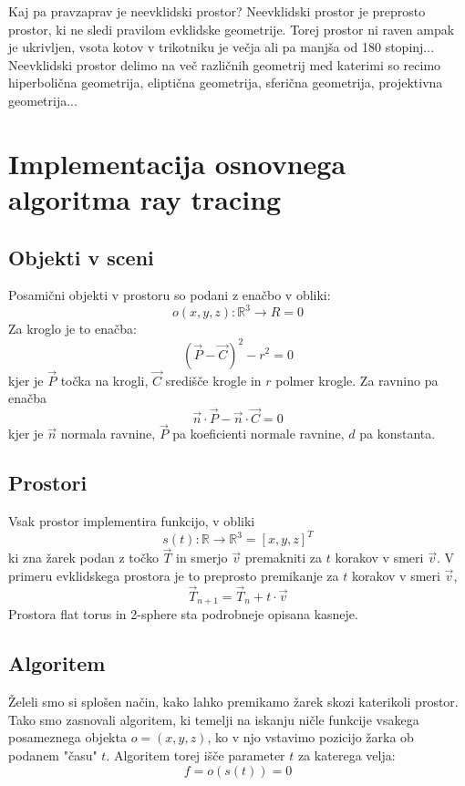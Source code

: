 \documentclass[titlepage]{article}
\begin{document}
Kaj pa pravzaprav je neevklidski prostor?
Neevklidski prostor je preprosto prostor, ki ne sledi pravilom evklidske geometrije. Torej prostor ni raven ampak je ukrivljen, vsota kotov v trikotniku je večja ali pa manjša od 180 stopinj... Neevklidski prostor delimo na več različnih geometrij med katerimi so recimo hiperbolična geometrija, eliptična geometrija, sferična geometrija, projektivna geometrija...

\section{Implementacija osnovnega algoritma ray tracing}
\subsection{Objekti v sceni}
Posamični objekti v prostoru so podani z enačbo v obliki:
\[ o(x,y,z): \mathbb{R}^3 \to R =0 \]
Za kroglo je to enačba: 
\[ (\vec{P} - \vec{C})^2 - r^2 = 0 \]
kjer je \(\vec{P}\) točka na krogli, \(\vec{C}\) središče krogle in \(r\) polmer krogle. \newline
Za ravnino pa enačba 
\[ \vec{n} \cdot \vec{P} - \vec{n} \cdot \vec{C} = 0 \]
kjer je \(\vec{n}\) normala ravnine, \(\vec{P}\) pa koeficienti normale ravnine, \(d\) pa konstanta.

\subsection{Prostori}
Vsak prostor implementira funkcijo, v obliki
\[ s(t): \mathbb{R} \to \mathbb{R}^3 = [x, y, z]^T \]
ki zna žarek podan z točko \(\vec{T}\) in smerjo \(\vec{v}\) premakniti za \(t\) korakov v smeri \(\vec{v}\).
V primeru evklidskega prostora je to preprosto premikanje za \(t\) korakov v smeri \(\vec{v}\), 
\[ \vec{T}_{n+1} = \vec{T}_{n} + t \cdot \vec{v} \]
Prostora flat torus in 2-sphere sta podrobneje opisana kasneje.

\subsection{Algoritem}
Želeli smo si splošen način, kako lahko premikamo žarek skozi katerikoli prostor. Tako smo zasnovali algoritem, ki temelji na iskanju ničle funkcije vsakega posameznega objekta \( o = (x, y, z) \), ko v njo vstavimo pozicijo žarka ob podanem "času" \( t \). Algoritem torej išče parameter \( t \) za katerega velja:
\[ f = o(s(t)) = 0 \]
\end{document}
